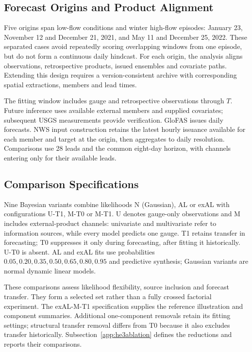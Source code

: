 \documentclass[APA,STIX1COL]{WileyNJD-v2}
\begin{document}
\subsection{Forecast Origins and Product Alignment}

Five origins span low-flow conditions and winter high-flow episodes: January 23, November 12 and December 21, 2021, and May 11 and December 25, 2022. These separated cases avoid repeatedly scoring overlapping windows from one episode, but do not form a continuous daily hindcast. For each origin, the analysis aligns observations, retrospective products, issued ensembles and covariate paths. Extending this design requires a version-consistent archive with corresponding spatial extractions, members and lead times.

The fitting window includes gauge and retrospective observations through $T$. Future inference uses available external members and supplied covariates; subsequent USGS measurements provide verification. GloFAS issues daily forecasts. NWS input construction retains the latest hourly issuance available for each member and target at the origin, then aggregates to daily resolution. Comparisons use 28 leads and the common eight-day horizon, with channels entering only for their available leads.

\subsection{Comparison Specifications}
\label{subsec:comparisonspecifications}

Nine Bayesian variants combine likelihoods N (Gaussian), AL or exAL with configurations U-T1, M-T0 or M-T1. U denotes gauge-only observations and M includes external-product channels: univariate and multivariate refer to information sources, while every model predicts one gauge. T1 retains transfer in forecasting; T0 suppresses it only during forecasting, after fitting it historically. U-T0 is absent. AL and exAL fits use probabilities $0.05,0.20,0.35,0.50,0.65,0.80,0.95$ and predictive synthesis; Gaussian variants are normal dynamic linear models.

These comparisons assess likelihood flexibility, source inclusion and forecast transfer. They form a selected set rather than a fully crossed factorial experiment. The exAL-M-T1 specification supplies the reference illustration and component summaries. Additional one-component removals retain its fitting settings; structural transfer removal differs from T0 because it also excludes transfer historically. Subsection~\ref{app:he3ablation} defines the reductions and reports their comparisons.
\end{document}
